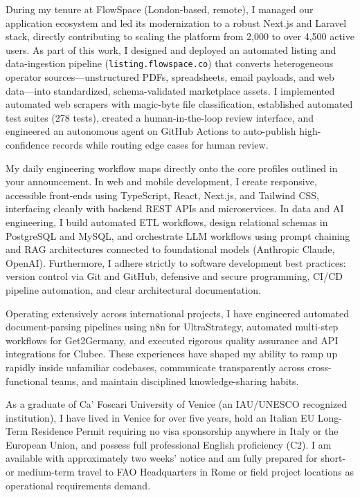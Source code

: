 \documentclass[11pt,a4paper]{article}
\begin{document}
During my tenure at FlowSpace (London-based, remote), I managed our application ecosystem and led its modernization to a robust Next.js and Laravel stack, directly contributing to scaling the platform from 2,000 to over 4,500 active users. As part of this work, I designed and deployed an automated listing and data-ingestion pipeline (\texttt{listing.flowspace.co}) that converts heterogeneous operator sources---unstructured PDFs, spreadsheets, email payloads, and web data---into standardized, schema-validated marketplace assets. I implemented automated web scrapers with magic-byte file classification, established automated test suites (278 tests), created a human-in-the-loop review interface, and engineered an autonomous agent on GitHub Actions to auto-publish high-confidence records while routing edge cases for human review.

My daily engineering workflow maps directly onto the core profiles outlined in your announcement. In web and mobile development, I create responsive, accessible front-ends using TypeScript, React, Next.js, and Tailwind CSS, interfacing cleanly with backend REST APIs and microservices. In data and AI engineering, I build automated ETL workflows, design relational schemas in PostgreSQL and MySQL, and orchestrate LLM workflows using prompt chaining and RAG architectures connected to foundational models (Anthropic Claude, OpenAI). Furthermore, I adhere strictly to software development best practices: version control via Git and GitHub, defensive and secure programming, CI/CD pipeline automation, and clear architectural documentation.

Operating extensively across international projects, I have engineered automated document-parsing pipelines using n8n for UltraStrategy, automated multi-step workflows for Get2Germany, and executed rigorous quality assurance and API integrations for Clubee. These experiences have shaped my ability to ramp up rapidly inside unfamiliar codebases, communicate transparently across cross-functional teams, and maintain disciplined knowledge-sharing habits.

As a graduate of Ca' Foscari University of Venice (an IAU/UNESCO recognized institution), I have lived in Venice for over five years, hold an Italian EU Long-Term Residence Permit requiring no visa sponsorship anywhere in Italy or the European Union, and possess full professional English proficiency (C2). I am available with approximately two weeks' notice and am fully prepared for short- or medium-term travel to FAO Headquarters in Rome or field project locations as operational requirements demand.
\end{document}
